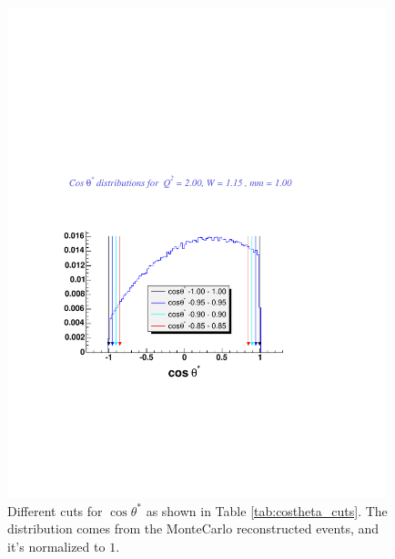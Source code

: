 \begin{figure}[h]
 \begin{center}
  \includegraphics[width = 11cm, bb = 80 150 500 520]{systematics/img/ccuts}
  \caption{ Different cuts for $\cos\theta^*$ as shown in Table \ref{tab:costheta_cuts}. 
            The distribution comes from the MonteCarlo reconstructed events, and it's normalized to $1$.}
  \label{fig:ccuts}
 \end{center}
\end{figure} 


